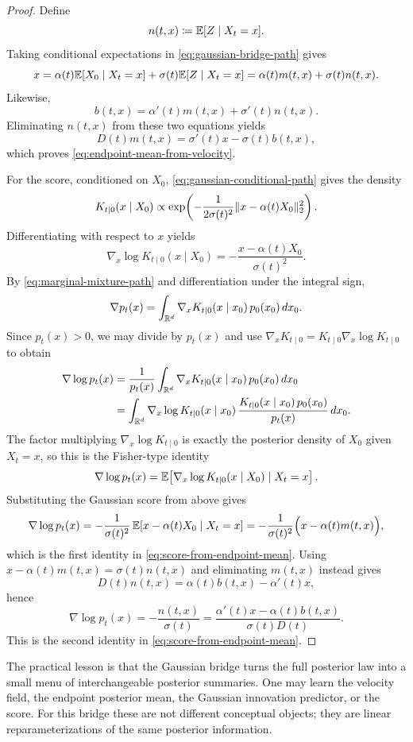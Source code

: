\begin{proof}
Define
\[
  n(t,x)\coloneqq \mathbb{E}[Z\mid X_t=x].
\]
Taking conditional expectations in \eqref{eq:gaussian-bridge-path} gives
\[
  x = \alpha(t)\mathbb{E}[X_0\mid X_t=x] + \sigma(t)\mathbb{E}[Z\mid X_t=x]
  = \alpha(t)m(t,x)+\sigma(t)n(t,x).
\]
Likewise,
\[
  b(t,x)=\alpha'(t)m(t,x)+\sigma'(t)n(t,x).
\]
Eliminating \(n(t,x)\) from these two equations yields
\[
  D(t)m(t,x)=\sigma'(t)x-\sigma(t)b(t,x),
\]
which proves \eqref{eq:endpoint-mean-from-velocity}.

For the score, conditioned on \(X_0\), \eqref{eq:gaussian-conditional-path} gives the density
\[
  K_{t\mid 0}(x\mid X_0)
  \propto
  \exp\!\left(-\frac{1}{2\sigma(t)^2}\lVert x-\alpha(t)X_0\rVert_2^2\right).
\]
Differentiating with respect to \(x\) yields
\[
  \nabla_x\log K_{t\mid 0}(x\mid X_0)
  =
  -\frac{x-\alpha(t)X_0}{\sigma(t)^2}.
\]
By \eqref{eq:marginal-mixture-path} and differentiation under the integral sign,
\[
  \nabla p_t(x)
  =
  \int_{\mathbb{R}^d}\nabla_x K_{t\mid 0}(x\mid x_0)\,p_0(x_0)\,dx_0.
\]
Since \(p_t(x)>0\), we may divide by \(p_t(x)\) and use \(\nabla_x K_{t\mid 0}=K_{t\mid 0}\nabla_x\log K_{t\mid 0}\) to obtain
\begin{align*}
  \nabla\log p_t(x)
  &=
  \frac{1}{p_t(x)}
  \int_{\mathbb{R}^d}\nabla_x K_{t\mid 0}(x\mid x_0)\,p_0(x_0)\,dx_0 \\
  &=
  \int_{\mathbb{R}^d}\nabla_x\log K_{t\mid 0}(x\mid x_0)\,
  \frac{K_{t\mid 0}(x\mid x_0)\,p_0(x_0)}{p_t(x)}\,dx_0.
\end{align*}
The factor multiplying \(\nabla_x\log K_{t\mid 0}\) is exactly the posterior density of \(X_0\) given \(X_t=x\), so this is the Fisher-type identity
\[
  \nabla\log p_t(x)
  =
  \mathbb{E}\!\left[\nabla_x\log K_{t\mid 0}(x\mid X_0)\mid X_t=x\right].
\]
Substituting the Gaussian score from above gives
\[
  \nabla\log p_t(x)
  =
  -\frac{1}{\sigma(t)^2}\,\mathbb{E}\!\left[x-\alpha(t)X_0\mid X_t=x\right]
  =
  -\frac{1}{\sigma(t)^2}\Bigl(x-\alpha(t)m(t,x)\Bigr),
\]
which is the first identity in \eqref{eq:score-from-endpoint-mean}.
Using \(x-\alpha(t)m(t,x)=\sigma(t)n(t,x)\) and eliminating \(m(t,x)\) instead gives
\[
  D(t)n(t,x)=\alpha(t)b(t,x)-\alpha'(t)x,
\]
hence
\[
  \nabla\log p_t(x)
  =
  -\frac{n(t,x)}{\sigma(t)}
  =
  \frac{\alpha'(t)x-\alpha(t)b(t,x)}{\sigma(t)D(t)}.
\]
This is the second identity in \eqref{eq:score-from-endpoint-mean}.
\end{proof}

The practical lesson is that the Gaussian bridge turns the full posterior law into a small menu of interchangeable posterior summaries.
One may learn the velocity field, the endpoint posterior mean, the Gaussian innovation predictor, or the score.
For this bridge these are not different conceptual objects; they are linear reparameterizations of the same posterior information.

